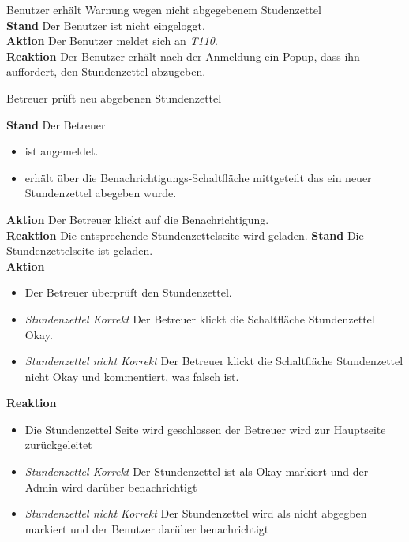 \begin{requirements}
	 Benutzer erhält Warnung wegen nicht abgegebenem Studenzettel \\
        \textbf{Stand} Der Benutzer ist nicht eingeloggt. \\
        \textbf{Aktion} Der Benutzer meldet sich an \textit{T110}. \\
        \textbf{Reaktion} Der Benutzer erhält nach der Anmeldung ein Popup, dass ihn auffordert, den Stundenzettel abzugeben.

	 Betreuer prüft neu abgebenen Stundenzettel
	\begin{requirements}
	        \textbf{Stand} Der Betreuer
	            \begin{itemize}
	                \item ist angemeldet.
	                \item erhält über die Benachrichtigungs-Schaltfläche mittgeteilt das ein neuer Stundenzettel abegeben wurde.
	            \end{itemize}
            \textbf{Aktion} Der Betreuer klickt auf die Benachrichtigung. \\
            \textbf{Reaktion} Die entsprechende Stundenzettelseite wird  geladen.
	        \textbf{Stand} Die Stundenzettelseite ist geladen. \\
            \textbf{Aktion}
                \begin{itemize}
                    \item Der Betreuer überprüft den Stundenzettel.
                    \item \textit{Stundenzettel Korrekt} Der Betreuer klickt die Schaltfläche Stundenzettel Okay.
                    \item \textit{Stundenzettel nicht Korrekt}  Der Betreuer klickt die Schaltfläche Stundenzettel nicht Okay und kommentiert, was falsch ist.
                \end{itemize}
            \textbf{Reaktion}
                \begin{itemize}
                    \item Die Stundenzettel Seite wird geschlossen der Betreuer wird zur Hauptseite zurückgeleitet
                    \item \textit{Stundenzettel Korrekt} Der Stundenzettel ist als Okay markiert und der Admin wird darüber benachrichtigt
                    \item \textit{Stundenzettel nicht Korrekt} Der Stundenzettel wird als nicht abgegben markiert und der Benutzer darüber benachrichtigt
                \end{itemize}
	\end{requirements}


\end{requirements}
